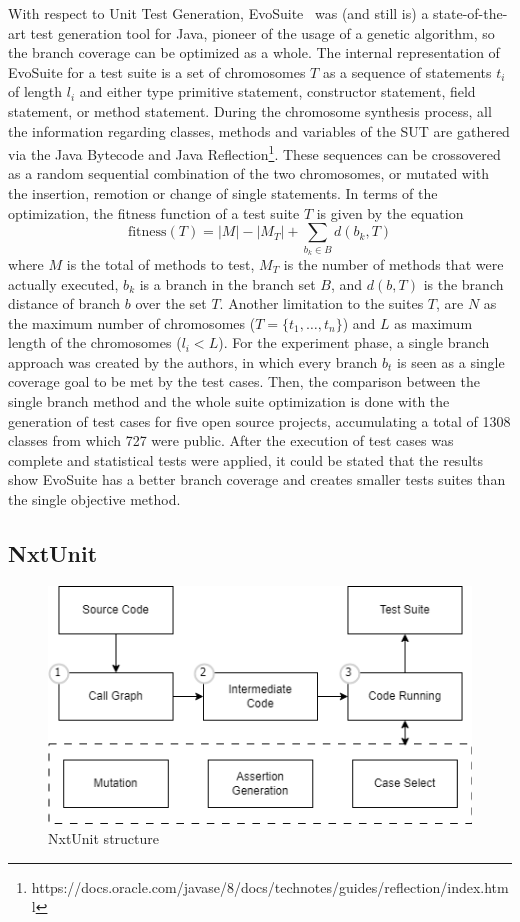 \documentclass[%
  chapterprefix=false,%
  open=right,%
  twoside=true,%
  paper=a4,%
  logofile={Figures/logo.png},%
  thesistype=master,%
  UKenglish,%
]{se2thesis}
\begin{document}
With respect to Unit Test Generation, EvoSuite~\cite{DBLP:conf/qsic/FraserA11} was (and still is) a state-of-the-art test generation tool for Java, pioneer of the usage of a genetic algorithm, so the branch coverage can be optimized as a whole.
The internal representation of EvoSuite for a test suite is a set of chromosomes \(T\) as a sequence of statements \(t_i\) of length \(l_i\) and either type primitive statement, constructor statement, field statement, or method statement.
During the chromosome synthesis process, all the information regarding classes, methods and variables of the SUT are gathered via the Java Bytecode and Java Reflection\footnote{https://docs.oracle.com/javase/8/docs/technotes/guides/reflection/index.html}.
These sequences can be crossovered as a random sequential combination of the two chromosomes, or mutated with the insertion, remotion or change of single statements.
In terms of the optimization, the fitness function of a test suite $T$ is given by the equation
\[ \text{fitness}(T) = |M| - |M_T| + \sum_{b_k \in B} d(b_k, T) \]
where \(M\) is the total of methods to test, \(M_T\) is the number of methods that were actually executed, \(b_k\) is a branch in the branch set \(B\), and \(d(b, T)\) is the branch distance of branch \(b\) over the set \(T\).
Another limitation to the suites \(T\), are \(N\) as the maximum number of chromosomes (\(T = \{t_1, \dots , t_n\}\)) and \(L\) as maximum length of the chromosomes (\(l_i < L\)).
For the experiment phase, a single branch approach was created by the authors, in which every branch \(b_t\) is seen as a single coverage goal to be met by the test cases.
Then, the comparison between the single branch method and the whole suite optimization is done with the generation of test cases for five open source projects, accumulating a total of 1308 classes from which 727 were public.
After the execution of test cases was complete and statistical tests were applied, it could be stated that the results show EvoSuite has a better branch coverage and creates smaller tests suites than the single objective method.
\subsection{NxtUnit}

\begin{figure}[bt]
  \centering
  \includegraphics[width=.99\textwidth]{Figures/nxtunit2.png}
  \caption{NxtUnit structure}\label{fig:nxt}
\end{figure}
\end{document}
